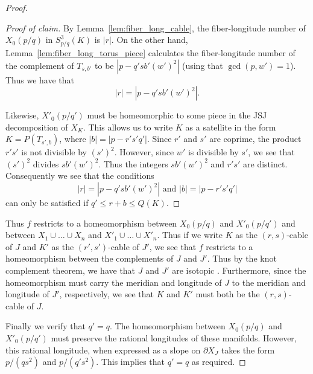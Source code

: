 \documentclass{amsart} %
\theoremstyle{thm}
\theoremstyle{definition}
\numberwithin{equation}{section}
\begin{document}
\begin{proof}
\begin{proof}[Proof of claim]
    
    By Lemma~\ref{lem:fiber_long_cable}, the fiber-longitude number of $X_0(p/q)$ in $S_{p/q}^3(K)$ is $|r|$. On the other hand, Lemma~\ref{lem:fiber_long_torus_piece} calculates the fiber-longitude number of the complement of $T_{s, b'}$ to be $|p-q'sb'(w')^2|$ (using that $\gcd(p,w')=1$). Thus we have that
    \[
    |r|=|p-q'sb'(w')^2|.
    \]

    Likewise, $X'_0(p/q')$ must be homeomorphic to some piece in the JSJ decomposition of $X_K$. This allows us to write $K$ as a satellite in the form $K=P(T_{s',b})$, where $|b|=|p-r's'q'|$. %
    Since $r'$ and $s'$ are coprime, the product $r's'$ is not divisible by $(s')^2$. However, since $w'$ is divisible by $s'$, we see that $(s')^2$ divides $sb'(w')^2$. Thus the integers $sb'(w')^2$ and $r's'$ are distinct. Consequently we see that the conditions
    \[
    \text{$|r|=|p-q'sb'(w')^2|$ and $|b|=|p-r's'q'|$}
    \]
    can only be satisfied if $q'\leq r+b\leq Q(K)$.
\end{proof}
Thus $f$ restricts to a homeomorphism between $X_0(p/q)$ and $X'_0(p/q')$ and between $X_1\cup \dots \cup X_n$ and $X'_1 \cup \dots \cup X'_{n}$. Thus if we write $K$ as the $(r,s)$-cable of $J$ and $K'$ as the $(r',s')$-cable of $J'$, we see that $f$ restricts to a homeomorphism between the complements of $J$ and $J'$. Thus by the knot complement theorem, we have that $J$ and $J'$ are isotopic \cite{GL89}. Furthermore, since the homeomorphism must carry the meridian and longitude of $J$ to the meridian and longitude of $J'$, respectively, we see that $K$ and $K'$ must both be the $(r,s)$-cable of $J$. 

Finally we verify that $q'=q$. The homeomorphism between $X_0(p/q)$ and $X'_0(p/q')$ must preserve the rational longitudes of these manifolds. However, this rational longitude, when expressed as a slope on $\partial X_J$ takes the form $p/(qs^2)$ and $p/(q's^2)$. This implies that $q'=q$ as required.  
\end{proof}
\end{document}
